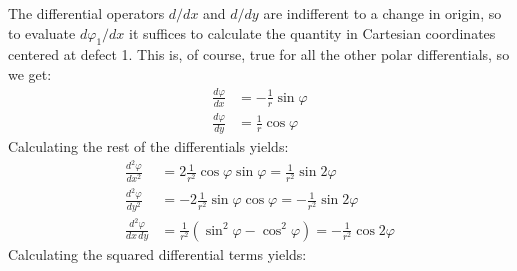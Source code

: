 \documentclass[reqno]{article}
\begin{document}
The differential operators $d/dx$ and $d/dy$ are indifferent to a change in origin, so to evaluate $d\varphi_1/dx$ it suffices to calculate the quantity in Cartesian coordinates centered at defect 1.
This is, of course, true for all the other polar differentials, so we get:
\begin{equation}
    \begin{split}
        \frac{d \varphi}{dx}
        &=
        -\frac{1}{r} \sin\varphi \\
        \frac{d \varphi}{dy}
        &=
        \frac{1}{r} \cos \varphi
    \end{split}
\end{equation}
Calculating the rest of the differentials yields:
\begin{equation} \label{eq:second-derivatives}
    \begin{split}
        \frac{d^2 \varphi}{dx^2}
        &=
        2\frac{1}{r^2} \cos\varphi \sin\varphi
        =
        \frac{1}{r^2} \sin 2\varphi
        \\
        \frac{d^2 \varphi}{dy^2}
        &=
        -2\frac{1}{r^2} \sin\varphi \cos \varphi 
        =
        -\frac{1}{r^2} \sin 2\varphi
        \\
        \frac{d^2 \varphi}{dx \, dy}
        &=
         \frac{1}{r^2} \left(\sin^2\varphi - \cos^2\varphi\right) 
        = -\frac{1}{r^2} \cos 2\varphi
    \end{split}
\end{equation}
Calculating the squared differential terms yields:
\end{document}
